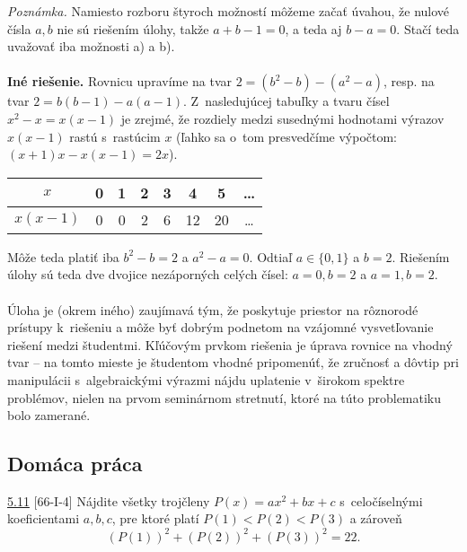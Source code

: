 \textit{Poznámka.} Namiesto rozboru štyroch možností môžeme začať úvahou, že nulové čísla $a, b$ nie sú riešením úlohy, takže $a + b - 1 = 0$, a teda aj $b - a = 0$. Stačí teda uvažovať iba možnosti a) a b).\\
\\
\textbf{Iné riešenie.} Rovnicu upravíme na tvar $2 = (b^2 - b) - (a^2 - a)$, resp. na tvar $2 = b(b - 1)-a(a-1)$. Z~nasledujúcej tabuľky a tvaru čísel $x^2 -x = x(x-1)$ je zrejmé, že rozdiely medzi susednými hodnotami výrazov $x(x - 1)$ rastú s~rastúcim $x$ (ľahko sa o~tom presvedčíme výpočtom: $(x + 1)x - x(x - 1) = 2x$).
\begin{center}
\begin{tabular}{|c|c|c|c|c|c|c|c|}
\hline
$x$ & 0 & 1 & 2 & 3 & 4 & 5 & \ldots \\
\hline
$x(x-1)$ & 0 & 0 & 2 & 6 & 12 & 20 & \ldots\\
\hline
\end{tabular}
\end{center}
Môže teda platiť iba $b^2 - b = 2$ a $a^2 - a = 0$. Odtiaľ $a \in \{0, 1\}$ a $b = 2$. Riešením úlohy sú teda dve dvojice nezáporných celých čísel: $a = 0, b = 2$ a $a = 1, b = 2$.\\
\\
\kom Úloha je (okrem iného) zaujímavá tým, že poskytuje priestor na rôznorodé prístupy k~riešeniu a môže byť dobrým podnetom na vzájomné vysvetľovanie riešení medzi študentmi. Kľúčovým prvkom riešenia je úprava rovnice na vhodný tvar -- na tomto mieste je študentom vhodné pripomenúť, že zručnosť a dôvtip pri manipulácii s~algebraickými výrazmi nájdu uplatenie v~širokom spektre problémov, nielen na prvom seminárnom stretnutí, ktoré na túto problematiku bolo zamerané.

\subsection*{Domáca práca}
\begin{tcolorbox}[breakable,notitle,boxrule=0pt,colback=light-gray,colframe=light-gray]\ul{5.11} [66-I-4]
Nájdite všetky trojčleny $P(x)=ax^2+bx+c$ s~celočíselnými koeficientami $a, b, c$, pre ktoré platí $P(1) < P(2) < P(3)$ a zároveň $$(P(1))^2+ (P(2))^2+ (P(3))^2= 22.$$
\end{tcolorbox}

